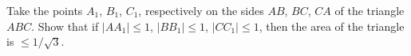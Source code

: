 Take the points $A_1$, $B_1$, $C_1$, respectively on the sides $AB$, $BC$, $CA$ of the triangle $ABC$. Show that if $|AA_1| \leq 1$, $|BB_1| \leq 1$, $|CC_1| \leq 1$, then the area of the triangle is $\leq 1/\sqrt{3}$.
